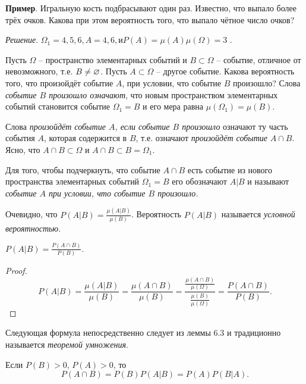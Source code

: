 \textbf{Пример}. Игральную кость подбрасывают один раз. Известно, что выпало более трёх очков. Какова при этом вероятность того, что выпало чётное число очков?

\textit{Решение}. $\Omega_1 = {4, 5, 6}, A = {4, 6}, и P(A) = \mu(A)
\mu(\Omega) = 3$ .

\begin{zam}
\label{zam:6.1}
Пусть $\Omega$ -- пространство элементарных событий и $B \subset \Omega$ -- событие, отличное от невозможного, т.е. $B \ne \varnothing$. 
Пусть $A \subset \Omega$ – другое событие. Какова вероятность того, что произойдёт событие $A$, при условии,
что событие $B$ произошло? Слова \textit{событие $B$ произошло означают}, что новым пространством элементарных событий становится событие $\Omega_1 = B$ и его мера равна $\mu(\Omega_1 ) = \mu(B)$. 

Слова \textit{произойдёт событие $A$, если событие $B$
произошло} означают ту часть события $A$, которая содержится в $B$, т.е. означают \textit{произойдёт событие} $A \cap B$. Ясно, что $A \cap B \subset \Omega$ и $A \cap B \subset B = \Omega_1$.
\end{zam}

\begin{definition}
Для того, чтобы подчеркнуть, что событие $A \cap B$ есть
событие из нового пространства элементарных событий $\Omega_1 = B$ его обозначают $A|B$ и называют \textit{событие $A$ при условии, что событие $B$ произошло.}

Очевидно, что $P(A|B)=\frac{\mu(A|B)}{\mu(B)}$. Вероятность $P(A|B)$ называется \textit{условной вероятностью}.
\end{definition}

\begin{lemma}
	$P(A|B) = \frac{P(A\cap B)}{P(B)}$.
\end{lemma}

\begin{proof}
\begin{equation*}
	P(A|B) = \frac{\mu(A|B)}{\mu(B)}=\frac{\mu(A\cap B)}{\mu(B)}
=\frac{\frac{\mu(A\cap B)}{\mu(\Omega)}}{\frac{\mu(B)}{\mu(\Omega)}}
=\frac{P(A\cap B)}{P(B)}.
\end{equation*}	
\end{proof}

Следующая формула непосредственно следует из леммы 6.3 и традиционно называется \textit{теоремой умножения}.

\begin{theorem}
Если $P(B) > 0$, $P(A) > 0$, то
\begin{equation*}
	P(A \cap B) = P(B)P(A|B) = P(A)P(B|A).
\end{equation*}
\end{theorem}

